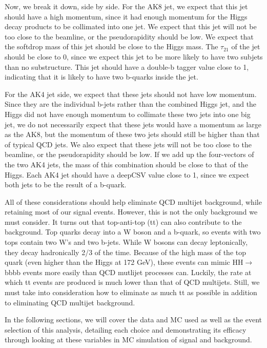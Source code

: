 Now, we break it down, side by side. For the AK8 jet, we expect that this jet should have a high momentum, since it had enough momentum for the Higgs decay products to be collimated into one jet. We expect that this jet will not be too close to the beamline, or the pseudorapidity should be low. We expect that the softdrop mass of this jet should be close to the Higgs mass. The $\tau_{21}$ of the jet should be close to 0, since we expect this jet to be more likely to have two subjets than no substructure. This jet should have a double-b tagger value close to 1, indicating that it is likely to have two b-quarks inside the jet.

For the AK4 jet side, we expect that these jets should not have low momentum. Since they are the individual b-jets rather than the combined Higgs jet, and the Higgs did not have enough momentum to collimate these two jets into one big jet, we do not necessarily expect that these jets would have a momentum as large as the AK8, but the momentum of these two jets should still be higher than that of typical QCD jets. We also expect that these jets will not be too close to the beamline, or the pseudorapidity should be low. If we add up the four-vectors of the two AK4 jets, the mass of this combination should be close to that of the Higgs. Each AK4 jet should have a deepCSV value close to 1, since we expect both jets to be the result of a b-quark.

All of these considerations should help eliminate QCD multijet background, while retaining most of our signal events. However, this is not the only background we must consider. It turns out that top-anti-top (tt) can also contribute to the background. Top quarks decay into a W boson and a b-quark, so events with two tops contain two W's and two b-jets. While W bosons can decay leptonically, they decay hadronically 2/3 of the time. Because of the high mass of the top quark (even higher than the Higgs at 172 GeV), these events can mimic HH$\rightarrow$bbbb events more easily than QCD mutlijet processes can. Luckily, the rate at which tt events are produced is much lower than that of QCD multijets. Still, we must take into consideration how to eliminate as much tt as possible in addition to eliminating QCD multijet background. 

In the following sections, we will cover the data and MC used as well as the event selection of this analysis, detailing each choice and demonstrating its efficacy through looking at these variables in MC simulation of signal and background.

